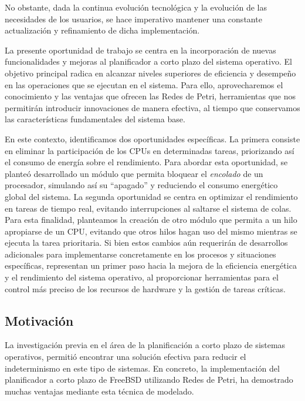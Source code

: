No obstante, dada la continua evolución tecnológica y la evolución de las necesidades de los usuarios, se hace imperativo mantener una constante actualización y refinamiento de dicha implementación.\par

La presente oportunidad de trabajo se centra en la incorporación de nuevas funcionalidades y mejoras al planificador a corto plazo del sistema operativo. El objetivo principal radica en alcanzar niveles superiores de eficiencia y desempeño en las operaciones que se ejecutan en el sistema. Para ello, aprovecharemos el conocimiento y las ventajas que ofrecen las Redes de Petri, herramientas que nos permitirán introducir innovaciones de manera efectiva, al tiempo que conservamos las características fundamentales del sistema base.\par

En este contexto, identificamos dos oportunidades específicas. La primera consiste en eliminar la participación de los CPUs en determinadas tareas, priorizando así el consumo de energía sobre el rendimiento. Para abordar esta oportunidad, se planteó desarrollado un módulo que permita bloquear el \textit{encolado} de un procesador, simulando así su ``apagado'' y reduciendo el consumo energético global del sistema. La segunda oportunidad se centra en optimizar el rendimiento en tareas de tiempo real, evitando interrupciones al saltarse el sistema de colas. Para esta finalidad, planteamos la creación de otro módulo que permita a un hilo apropiarse de un CPU, evitando que otros hilos hagan uso del mismo mientras se ejecuta la tarea prioritaria. Si bien estos cambios aún requerirán de desarrollos adicionales para implementarse concretamente en los procesos y situaciones específicas, representan un primer paso hacia la mejora de la eficiencia energética y el rendimiento del sistema operativo, al proporcionar herramientas para el control más preciso de los recursos de hardware y la gestión de tareas críticas.\par

\subsection{Motivación}
La investigación previa en el área de la planificación a corto plazo de sistemas operativos, permitió encontrar una solución efectiva para reducir el indeterminismo en este tipo de sistemas. En concreto, la implementación del planificador a corto plazo de FreeBSD utilizando Redes de Petri, ha demostrado muchas ventajas mediante esta técnica de modelado.\par

